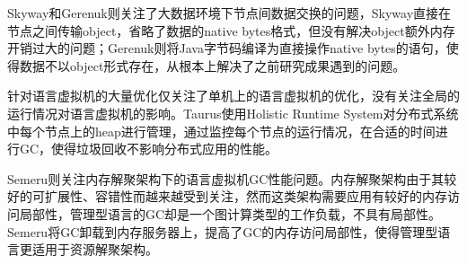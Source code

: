 \documentclass[lang=cn,12pt,a4paper,cite=authoryear]{elegantpaper}
\begin{document}
\begin{figure*}[!htp]
Skyway和Gerenuk则关注了大数据环境下节点间数据交换的问题，Skyway直接在节点之间传输object，省略了数据的native bytes格式，但没有解决object额外内存开销过大的问题；Gerenuk则将Java字节码编译为直接操作native bytes的语句，使得数据不以object形式存在，从根本上解决了之前研究成果遇到的问题。

针对语言虚拟机的大量优化仅关注了单机上的语言虚拟机的优化，没有关注全局的运行情况对语言虚拟机的影响。Taurus使用Holistic Runtime System对分布式系统中每个节点上的heap进行管理，通过监控每个节点的运行情况，在合适的时间进行GC，使得垃圾回收不影响分布式应用的性能。

Semeru则关注内存解聚架构下的语言虚拟机GC性能问题。内存解聚架构由于其较好的可扩展性、容错性而越来越受到关注，然而这类架构需要应用有较好的内存访问局部性，管理型语言的GC却是一个图计算类型的工作负载，不具有局部性。Semeru将GC卸载到内存服务器上，提高了GC的内存访问局部性，使得管理型语言更适用于资源解聚架构。


\end{figure*}
\end{document}
